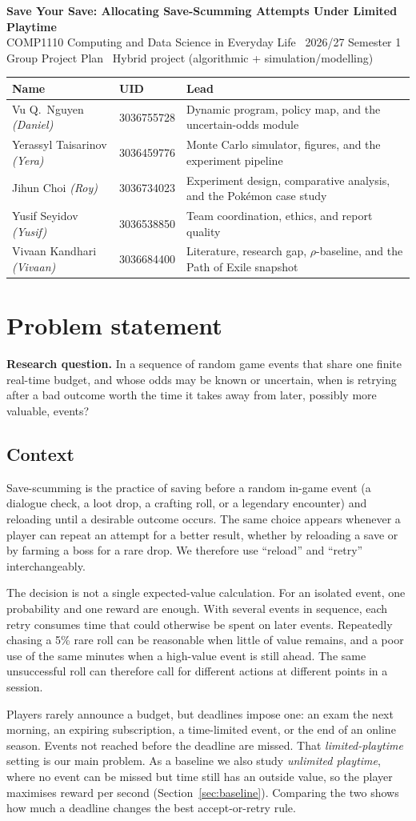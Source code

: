 \documentclass[11pt,a4paper]{article}
\makeatletter
\newcommand{\teamtable}{%
\renewcommand{\arraystretch}{1.28}%
\small
\begin{tabularx}{\textwidth}{@{}>{\raggedright\arraybackslash}p{4.15cm} l >{\raggedright\arraybackslash}X@{}}
\toprule
\textbf{Name} & \textbf{UID} & \textbf{Lead} \\
\midrule
Vu Q.\ Nguyen \textit{(Daniel)} & 3036755728 & Dynamic program, policy map, and the uncertain-odds module \\
Yerassyl Taisarinov \textit{(Yera)} & 3036459776 & Monte Carlo simulator, figures, and the experiment pipeline \\
Jihun Choi \textit{(Roy)} & 3036734023 & Experiment design, comparative analysis, and the Pok\'emon case study \\
Yusif Seyidov \textit{(Yusif)} & 3036538850 & Team coordination, ethics, and report quality \\
Vivaan Kandhari \textit{(Vivaan)} & 3036684400 & Literature, research gap, \(\rho\)-baseline, and the Path of Exile snapshot \\
\bottomrule
\end{tabularx}}
\makeatother
\begin{document}
\begin{center}
{\large\bfseries Save Your Save: Allocating Save-Scumming Attempts Under Limited Playtime}\\[0.35em]
{\normalsize COMP1110 Computing and Data Science in Everyday Life \textperiodcentered\ 2026/27 Semester 1}\\[0.15em]
{\normalsize Group Project Plan \textperiodcentered\ Hybrid project (algorithmic + simulation/modelling)}
\end{center}
\vspace{0.5em}
\teamtable

\section{Problem statement}

\textbf{Research question.}
In a sequence of random game events that share one finite real-time budget, and whose odds may be known or uncertain, when is retrying after a bad outcome worth the time it takes away from later, possibly more valuable, events?

\subsection{Context}
Save-scumming is the practice of saving before a random in-game event (a dialogue check, a loot drop, a crafting roll, or a legendary encounter) and reloading until a desirable outcome occurs. The same choice appears whenever a player can repeat an attempt for a better result, whether by reloading a save or by farming a boss for a rare drop. We therefore use ``reload'' and ``retry'' interchangeably.

The decision is not a single expected-value calculation. For an isolated event, one probability and one reward are enough. With several events in sequence, each retry consumes time that could otherwise be spent on later events. Repeatedly chasing a 5\% rare roll can be reasonable when little of value remains, and a poor use of the same minutes when a high-value event is still ahead. The same unsuccessful roll can therefore call for different actions at different points in a session.

Players rarely announce a budget, but deadlines impose one: an exam the next morning, an expiring subscription, a time-limited event, or the end of an online season. Events not reached before the deadline are missed. That \emph{limited-playtime} setting is our main problem. As a baseline we also study \emph{unlimited playtime}, where no event can be missed but time still has an outside value, so the player maximises reward per second (Section~\ref{sec:baseline}). Comparing the two shows how much a deadline changes the best accept-or-retry rule.
\end{document}
